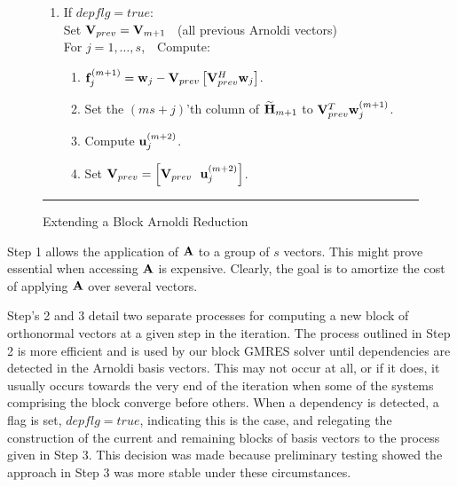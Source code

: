 \documentclass[twoside]{siamltex}
\newcommand{\bA}{{\bf A}}
\newcommand{\bF}{{\bf F}}
\newcommand{\bH}{{\bf H}}
\newcommand{\bV}{{\bf V}}
\newcommand{\bu}{{\bf u}}
\newcommand{\bw}{{\bf w}}
\begin{document}
{\begin{figure}
\begin{description}
\begin{enumerate}
\begin{enumerate}
\begin{itemize}
\begin{itemize}
\begin{itemize}
      \item If the columns of $\bF^{(m+1)}$ are linearly
      dependent, set $depflg = true$, and recompute $\bF^{(m+1)}$ using step 3.

      \end{itemize}
\end{itemize}

\item If dependencies exist
\begin{itemize}
\item Set $depflg = true$, recompute $\bF^{(m+1)}$
      using step 3 below.
\end{itemize}

\end{itemize}

\end{enumerate}

\item If $depflg = true$: \\
Set $\bV_{prev} = \bV_{m+1}$ ~(all previous Arnoldi vectors) \\
For $j = 1, \ldots, s$,~~Compute:
\begin{enumerate}

\item ${\bf f}_j^{(m+1)} = \bw_j - \bV_{prev} \left[ \bV_{prev}^H \bw_j \right]$.
\item Set the $(ms+j)$'th column of ${\widetilde \bH}_{m+1}$ to
$\bV_{prev}^T \bw_j^{(m+1)}$.
\item Compute $\bu_j^{(m+2)}$.
\item Set $\bV_{prev} = \left[ \bV_{prev} ~~ \bu_j^{(m+2)} \right]$.

\end{enumerate}

\end{enumerate}
\end{description}
\vspace{.1in} \hrule \caption{Extending a Block Arnoldi Reduction}
\label{fig:blk_arn_red_alg}
\end{figure}
}


Step 1 allows the application of $\bA$ to a group of $s$ vectors.
This might prove essential when accessing $\bA$ is expensive.
Clearly, the goal is to amortize the cost of applying $\bA$ over
several vectors.

Step's 2 and 3 detail two separate processes for computing a new
block of orthonormal vectors at a given step in the iteration. The
process outlined in Step 2 is more efficient and is used by our
block GMRES solver until dependencies are detected in the Arnoldi
basis vectors. This may not occur at all, or if it does, it
usually occurs towards the very end of the iteration when some of
the systems comprising the block converge before others. When a
dependency is detected, a flag is set, $depflg = true$, indicating
this is the case, and relegating the construction of the current
and remaining blocks of basis vectors to the process given in Step
3. This decision was made because preliminary testing showed the
approach in Step 3 was more stable under these circumstances.
\end{document}
